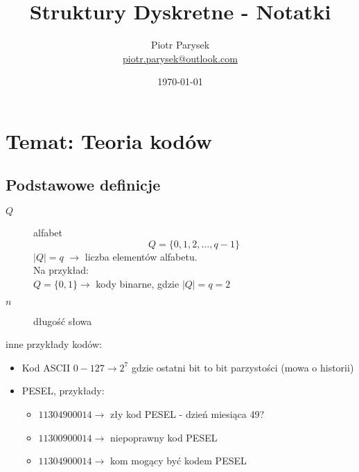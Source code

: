 \documentclass[a4paper,12pt]{article}
\title{Struktury Dyskretne - Notatki}
\author{Piotr Parysek\\
\href{mailto:piotr.parysek@outlook.com}{piotr.parysek@outlook.com} }
\date{\today}
\theoremstyle{definition}%
\theoremstyle{definition}
\theoremstyle{problem}
\begin{document}
\maketitle

\tableofcontents
\section[Wykład 10: 18-V-2017 - Temat: Teoria kodów]{Temat: Teoria kodów}
\subsection{Podstawowe definicje}
\begin{description}
\item[$Q$] alfabet $$Q=\{0,1,2,\dots ,q-1\}$$
$|Q|=q$ $\rightarrow$ liczba elementów alfabetu.\\
Na przykład:\\
$Q=\{0,1\}\rightarrow$ kody binarne, gdzie $|Q|=q=2$
\item[$n$] długość słowa
\end{description}
inne przykłady kodów:
\begin{itemize}
\item Kod ASCII $0-127\rightarrow 2^7$ gdzie ostatni bit to bit parzystości (mowa o historii)
\item PESEL, przykłady:
\begin{itemize}
\item[] $11304900014\rightarrow$ zły kod PESEL - dzień miesiąca 49? 
\item[] $11300900014\rightarrow$ niepoprawny kod PESEL
\item[] $11304900014\rightarrow$ kom mogący być kodem PESEL
\end{itemize}
\end{itemize}
\end{document}
